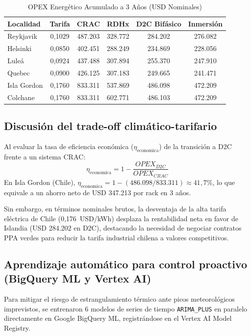 \documentclass[journal]{IEEEtran}
\begin{document}
\begin{table}[htbp]
\caption{OPEX Energ\'etico Acumulado a 3 A\~nos (USD Nominales)}
\label{tab:opex}
\centering
\begin{tabular}{lccccc}
\toprule
Localidad & Tarifa & CRAC & RDHx & D2C Bif\'asico & Inmersi\'on \\
\midrule
Reykjavik & 0,1029 & 487.203 & 328.772 & 284.202 & 276.082 \\
Helsinki & 0,0850 & 402.451 & 288.249 & 234.869 & 228.056 \\
Lule\aa & 0,0924 & 437.488 & 307.894 & 255.370 & 247.910 \\
Quebec & 0,0900 & 426.125 & 307.183 & 249.665 & 241.471 \\
Isla Gordon & 0,1760 & 833.311 & 537.869 & 486.098 & 472.209 \\
Colchane & 0,1760 & 833.311 & 602.771 & 486.103 & 472.209 \\
\bottomrule
\end{tabular}
\end{table}

\subsection{Discusi\'on del trade-off clim\'atico-tarifario}
Al evaluar la tasa de eficiencia econ\'omica ($\eta_{\text{economica}}$) de la transici\'on a D2C frente a un sistema CRAC:
\begin{equation}
\eta_{\text{economica}} = 1 - \frac{OPEX_{D2C}}{OPEX_{CRAC}}
\end{equation}
En Isla Gordon (Chile), $\eta_{\text{economica}} = 1 - (486.098 / 833.311) \approx 41,7\%$, lo que equivale a un ahorro neto de USD 347.213 por rack en 3 a\~nos. 

Sin embargo, en t\'erminos nominales brutos, la desventaja de la alta tarifa el\'ectrica de Chile (0,176~USD/kWh) desplaza la rentabilidad neta en favor de Islandia (USD 284.202 en D2C), destacando la necesidad de negociar contratos PPA verdes para reducir la tarifa industrial chilena a valores competitivos.

\subsection{Aprendizaje autom\'atico para control proactivo (BigQuery ML y Vertex AI)}
Para mitigar el riesgo de estrangulamiento t\'ermico ante picos meteorol\'ogicos imprevistos, se entrenaron 6 modelos de series de tiempo \texttt{ARIMA\_PLUS} en paralelo directamente en Google BigQuery ML, registr\'andose en el Vertex AI Model Registry.
\end{document}
